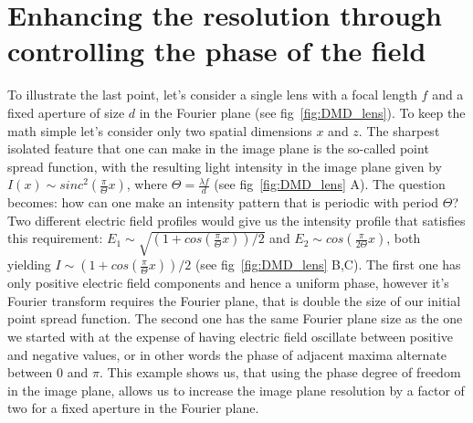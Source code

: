 \section{Enhancing the resolution through controlling the phase of the field}
To illustrate the last point, let's consider a single lens with a focal length $f$ and a fixed aperture of size $d$ in the Fourier plane (see fig~\ref{fig:DMD_lens}). To keep the math simple let's consider only two spatial dimensions $x$ and $z$. The sharpest isolated feature that one can make in the image plane is the so-called point spread function, with the resulting light intensity in the image plane given by $I(x) \sim sinc^2(\frac{\pi}{\Theta} x)$, where $\Theta = \frac{\lambda f}{d}$ (see fig~\ref{fig:DMD_lens} A). The question becomes: how can one make an intensity pattern that is periodic with period $\Theta$? Two different electric field profiles would give us the intensity profile that satisfies this requirement: $E_1 \sim \sqrt{(1+cos(\frac{\pi}{\Theta}x))/2}$ and $E_2 \sim cos(\frac{\pi}{2\Theta} x)$, both yielding $I \sim (1+cos(\frac{\pi}{\Theta}x))/2$ (see fig~\ref{fig:DMD_lens} B,C). The first one has only positive electric field components and hence a uniform phase, however it's Fourier transform requires the Fourier plane, that is double the size of our initial point spread function. The second one has the same Fourier plane size as the one we started with at the expense of having electric field oscillate between positive and negative values, or in other words the phase of adjacent maxima alternate between $0$ and $\pi$. This example shows us, that using the phase degree of freedom in the image plane, allows us to increase the image plane resolution by a factor of two for a fixed aperture in the Fourier plane.

